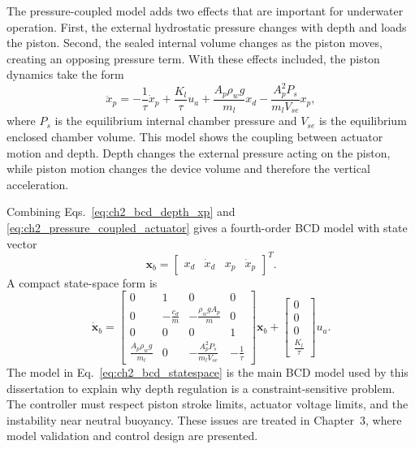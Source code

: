 \documentclass{uhcoethesis}
\begin{document}
The pressure-coupled model adds two effects that are important for underwater operation. First, the external hydrostatic pressure changes with depth and loads the piston. Second, the sealed internal volume changes as the piston moves, creating an opposing pressure term. With these effects included, the piston dynamics take the form
\begin{equation}
    \ddot{x}_p =
    -\frac{1}{\tau}\dot{x}_p
    + \frac{K_l}{\tau}u_a
    + \frac{A_p \rho_w g}{m_l}x_d
    - \frac{A_p^2 P_s}{m_l V_{se}}x_p ,
    \label{eq:ch2_pressure_coupled_actuator}
\end{equation}
where $P_s$ is the equilibrium internal chamber pressure and $V_{se}$ is the equilibrium enclosed chamber volume. This model shows the coupling between actuator motion and depth. Depth changes the external pressure acting on the piston, while piston motion changes the device volume and therefore the vertical acceleration.

Combining Eqs.~\eqref{eq:ch2_bcd_depth_xp} and \eqref{eq:ch2_pressure_coupled_actuator} gives a fourth-order BCD model with state vector
\begin{equation}
    \mathbf{x}_b =
    \begin{bmatrix}
        x_d & \dot{x}_d & x_p & \dot{x}_p
    \end{bmatrix}^T .
    \label{eq:ch2_bcd_state}
\end{equation}
A compact state-space form is
\begin{equation}
    \dot{\mathbf{x}}_b =
    \begin{bmatrix}
        0 & 1 & 0 & 0 \\
        0 & -\frac{c_d}{m} & -\frac{\rho_w g A_p}{m} & 0 \\
        0 & 0 & 0 & 1 \\
        \frac{A_p \rho_w g}{m_l} & 0 &
        -\frac{A_p^2 P_s}{m_l V_{se}} & -\frac{1}{\tau}
    \end{bmatrix}
    \mathbf{x}_b
    +
    \begin{bmatrix}
        0 \\ 0 \\ 0 \\ \frac{K_l}{\tau}
    \end{bmatrix}u_a .
    \label{eq:ch2_bcd_statespace}
\end{equation}
The model in Eq.~\eqref{eq:ch2_bcd_statespace} is the main BCD model used by this dissertation to explain why depth regulation is a constraint-sensitive problem. The controller must respect piston stroke limits, actuator voltage limits, and the instability near neutral buoyancy. These issues are treated in Chapter~3, where model validation and control design are presented.
\end{document}
